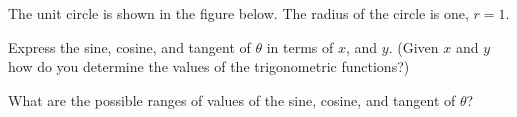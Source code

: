 \begin{problem}
  \clearpage


\item The unit circle is shown in the figure below. The radius of the
  circle is one, $r=1$.

  \scalebox{0.35}{}

  \begin{subproblem}
  \item Express the sine, cosine, and tangent of $\theta$ in terms of
    $x$, and $y$. (Given $x$ and $y$ how do you determine the values
    of the trigonometric functions?)  
    \vfill
  \item What are the possible ranges of values of the sine, cosine, and tangent
    of $\theta$?
    \vspace{8em}
  \end{subproblem}



\end{problem}


